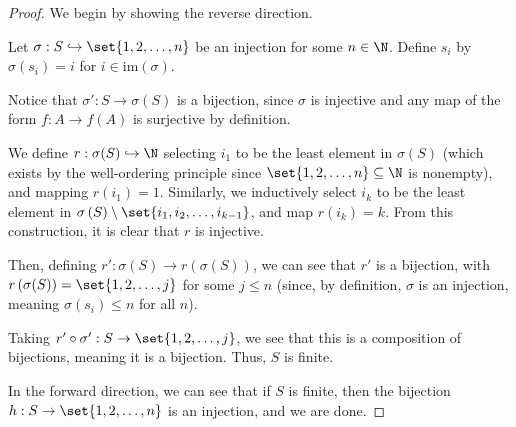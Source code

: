 \documentclass[10pt]{mypackage}
\begin{document}
\begin{proof}
  We begin by showing the reverse direction.\newline

  Let $\sigma: S\hookrightarrow \set{1,2,\dots,n}$ be an injection for some $n\in \N$. Define $s_i$ by $\sigma\left(s_i\right) = i$ for $i\in \text{im}\left(\sigma\right)$.\newline

  Notice that $\sigma': S\rightarrow \sigma(S)$ is a bijection, since $\sigma$ is injective and any map of the form $f: A\rightarrow f(A)$ is surjective by definition.\newline

  We define $r: \sigma(S) \hookrightarrow \N$ selecting $i_1$ to be the least element in $\sigma(S)$ (which exists by the well-ordering principle since $\set{1,2,\dots,n}\subseteq \N$ is nonempty), and mapping $r\left(i_1\right)= 1$. Similarly, we inductively select $i_k$ to be the least element in $\sigma\left(S\right) \setminus \set{i_1,i_2,\dots,i_{k-1}}$, and map $r\left(i_k\right) = k$. From this construction, it is clear that $r$ is injective.\newline

  Then, defining $r': \sigma\left(S\right)\rightarrow r\left(\sigma(S)\right)$, we can see that $r'$ is a bijection, with $r\left(\sigma(S)\right) = \set{1,2,\dots,j}$ for some $j\leq n$ (since, by definition, $\sigma$ is an injection, meaning $\sigma\left(s_i\right) \leq n$ for all $n$).\newline

  Taking $r'\circ \sigma': S\rightarrow \set{1,2,\dots,j}$, we see that this is a composition of bijections, meaning it is a bijection. Thus, $S$ is finite.\newline

  In the forward direction, we can see that if $S$ is finite, then the bijection $h: S\rightarrow \set{1,2,\dots,n}$ is an injection, and we are done.
\end{proof}
%
\end{document}
